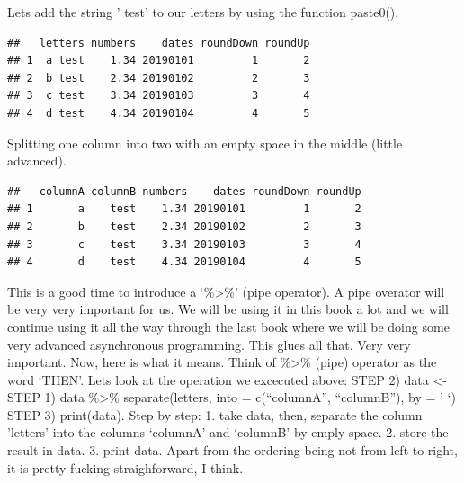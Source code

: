 \documentclass[]{book}
\newenvironment{Shaded}{\begin{snugshade}}{\end{snugshade}}
\newcommand{\CommentTok}[1]{\textcolor[rgb]{0.56,0.35,0.01}{\textit{#1}}}
\newcommand{\DataTypeTok}[1]{\textcolor[rgb]{0.13,0.29,0.53}{#1}}
\newcommand{\KeywordTok}[1]{\textcolor[rgb]{0.13,0.29,0.53}{\textbf{#1}}}
\newcommand{\NormalTok}[1]{#1}
\newcommand{\OperatorTok}[1]{\textcolor[rgb]{0.81,0.36,0.00}{\textbf{#1}}}
\newcommand{\StringTok}[1]{\textcolor[rgb]{0.31,0.60,0.02}{#1}}
\begin{document}
Lets add the string ' test' to our letters by using the function paste0().

\begin{Shaded}
\end{Shaded}

\begin{verbatim}
##   letters numbers    dates roundDown roundUp
## 1  a test    1.34 20190101         1       2
## 2  b test    2.34 20190102         2       3
## 3  c test    3.34 20190103         3       4
## 4  d test    4.34 20190104         4       5
\end{verbatim}

Splitting one column into two with an empty space in the middle (little advanced).

\begin{Shaded}
\end{Shaded}

\begin{verbatim}
##   columnA columnB numbers    dates roundDown roundUp
## 1       a    test    1.34 20190101         1       2
## 2       b    test    2.34 20190102         2       3
## 3       c    test    3.34 20190103         3       4
## 4       d    test    4.34 20190104         4       5
\end{verbatim}

This is a good time to introduce a `\%\textgreater{}\%' (pipe operator). A pipe overator will be very very important for us. We will be using it in this book a lot and we will continue using it all the way through the last book where we will be doing some very advanced asynchronous programming. This glues all that. Very very important. Now, here is what it means. Think of \%\textgreater{}\% (pipe) operator as the word `THEN'. Lets look at the operation we excecuted above: STEP 2) data \textless{}- STEP 1) data \%\textgreater{}\% separate(letters, into = c(``columnA'', ``columnB''), by = ' `) STEP 3) print(data). Step by step: 1. take data, then, separate the column 'letters' into the columns `columnA' and `columnB' by emply space. 2. store the result in data. 3. print data. Apart from the ordering being not from left to right, it is pretty fucking straighforward, I think.
\end{document}
